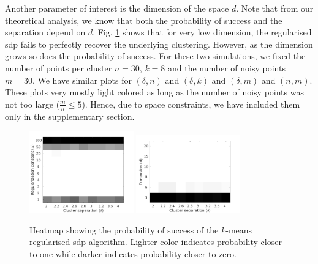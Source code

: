 \documentclass[12pt]{article}
\begin{document}
Another parameter of interest is the dimension of the space $d$. Note that from our theoretical analysis, we know that both the probability of success and the separation depend on $d$. Fig. \ref{figure:simulation} shows that for very low dimension, the regularised sdp fails to perfectly recover the underlying clustering. However, as the dimension grows so does the probability of success. For these two simulations, we fixed the number of points per cluster $n = 30$, $k = 8$ and the number of noisy points $m = 30$. We have similar plots for $(\delta, n)$ and $(\delta, k)$ and $(\delta, m)$ and $(n, m)$. These plots very mostly light colored as long as the number of noisy points was not too large ($\frac{m}{n} \le 5$). Hence, due to space constraints, we have included them only in the supplementary section.
   
\begin{figure}[t]
  \label{figure:simulation}
  \centering
  \includegraphics[width=0.4\textwidth]{figures/optimizationClustering/deltaLambda.png}
  \includegraphics[width=0.4\textwidth]{figures/optimizationClustering/deltaD.png}
  \caption{Heatmap showing the probability of success of the $k$-means regularised sdp algorithm. Lighter color indicates probability closer to one while darker indicates probability closer to zero.}  
\end{figure}
\end{document}
